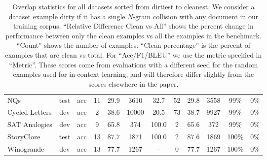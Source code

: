 \begin{table}
{\begin{adjustwidth}{-1.4in}{-1.4in}
\begin{center}
\begin{tabular}{lccccccccccc}
                 NQs &  test &      acc &  11 &        29.9 &                      3610 &                            32.7 &                        52 &                            29.8 &                      3558 &                            99\% &                                                 0\% \\
      Cycled Letters &   dev &      acc &   2 &        38.6 &                     10000 &                            20.5 &                        73 &                            38.7 &                      9927 &                            99\% &                                                 0\% \\
       SAT Analogies &   dev &      acc &   9 &        65.8 &                       374 &                           100.0 &                         2 &                            65.6 &                       372 &                            99\% &                                                 0\% \\
          StoryCloze &  test &      acc &  13 &        87.7 &                      1871 &                           100.0 &                         2 &                            87.6 &                      1869 &                           100\% &                                                 0\% \\
          Winogrande &   dev &      acc &  13 &        77.7 &                      1267 &                               - &                         0 &                            77.7 &                      1267 &                           100\% &                                                 0\% \\

\bottomrule
\end{tabular}
    
    
    
    
    
    \end{center}
    \end{adjustwidth}
    }
    
        \caption{Overlap statistics for all datasets sorted from dirtiest to cleanest. We consider a dataset example dirty if it has a single $N$-gram collision with any document in our training corpus. ``Relative Difference Clean vs All'' shows the percent change in performance between only the clean examples vs all the examples in the benchmark. ``Count'' shows the number of examples. ``Clean percentage'' is the percent of examples that are clean vs total. For ``Acc/F1/BLEU'' we use the metric specified in ``Metric''. These scores come from evaluations with a different seed for the random examples used for in-context learning, and will therefore differ slightly from the scores elsewhere in the paper. }
        \label{table:overlap_master}
    \end{table}